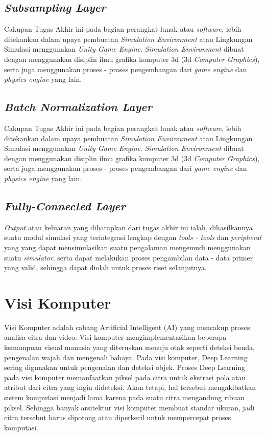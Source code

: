 \subsection{\textit{Subsampling Layer}}
Cakupan Tugas Akhir ini pada bagian perangkat lunak atau \textit{software}, lebih ditekankan dalam upaya pembuatan \textit{Simulation Environment} atau Lingkungan Simulasi menggunakan \textit{Unity Game Engine}. \textit{Simulation Environment} dibuat dengan menggunakan disiplin ilmu grafika komputer 3d (3d \textit{Computer Graphics}), serta juga menggunakan proses - proses pengembangan dari \textit{game engine} dan \textit{physics engine} yang lain.
\vspace{1ex}

\subsection{\textit{Batch Normalization Layer}}
Cakupan Tugas Akhir ini pada bagian perangkat lunak atau \textit{software}, lebih ditekankan dalam upaya pembuatan \textit{Simulation Environment} atau Lingkungan Simulasi menggunakan \textit{Unity Game Engine}. \textit{Simulation Environment} dibuat dengan menggunakan disiplin ilmu grafika komputer 3d (3d \textit{Computer Graphics}), serta juga menggunakan proses - proses pengembangan dari \textit{game engine} dan \textit{physics engine} yang lain.
\vspace{1ex}

\subsection{\textit{Fully-Connected Layer}}
\textit{Output} atau keluaran yang diharapkan dari tugas akhir ini ialah, dihasilkannya suatu modul simulasi yang terintegrasi lengkap dengan \textit{tools - tools} dan \textit{peripheral} yang yang dapat mensimulasikan suatu pengalaman mengemudi menggunakan suatu \textit{simulator}, serta dapat melakukan proses pengambilan data - data primer yang valid, sehingga dapat diolah untuk proses riset selanjutnya.
\vspace{1ex}

\section{Visi Komputer}
\vspace{1ex}

Visi Komputer adalah cabang Artificial Intelligent (AI) yang
mencakup proses analisa citra dan video. Visi komputer mengimplementasikan beberapa kemampuan visual manusia yang diteruskan
menuju otak seperti deteksi benda, pengenalan wajah dan mengenali bahaya.
Pada visi komputer, Deep Learning sering digunakan untuk pengenalan dan deteksi objek. Proses Deep Learning pada visi komputer memanfaatkan piksel pada citra untuk ekstrasi pola atau atribut
dari citra yang ingin dideteksi. Akan tetapi, hal tersebut mengakibatkan sistem komputasi menjadi lama karena pada suatu citra
mengandung ribuan piksel. Sehingga banyak arsitektur visi komputer membuat standar ukuran, jadi citra tersebut harus dipotong
atau diperkecil untuk mempercepat proses komputasi.
\vspace{1ex}

